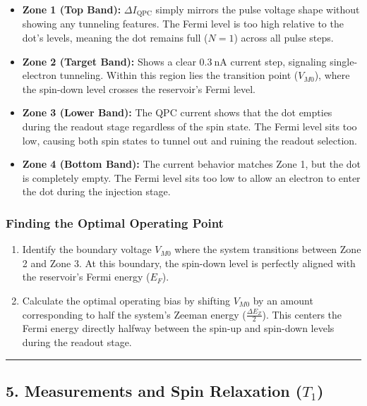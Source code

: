\documentclass[
]{article}
\providecommand{\tightlist}{%
  \setlength{\itemsep}{0pt}\setlength{\parskip}{0pt}}
\begin{document}
\begin{itemize}
\tightlist
\item
  \textbf{Zone 1 (Top Band):} \(\Delta I_{\text{QPC}}\) simply mirrors
  the pulse voltage shape without showing any tunneling features. The
  Fermi level is too high relative to the dot's levels, meaning the dot
  remains full (\(N=1\)) across all pulse steps.
\item
  \textbf{Zone 2 (Target Band):} Shows a clear \(0.3\ \text{nA}\)
  current step, signaling single-electron tunneling. Within this region
  lies the transition point (\(V_{M0}\)), where the spin-down level
  crosses the reservoir's Fermi level.
\item
  \textbf{Zone 3 (Lower Band):} The QPC current shows that the dot
  empties during the readout stage regardless of the spin state. The
  Fermi level sits too low, causing both spin states to tunnel out and
  ruining the readout selection.
\item
  \textbf{Zone 4 (Bottom Band):} The current behavior matches Zone 1,
  but the dot is completely empty. The Fermi level sits too low to allow
  an electron to enter the dot during the injection stage.
\end{itemize}

\subsubsection{Finding the Optimal Operating
Point}\label{finding-the-optimal-operating-point}

\begin{enumerate}
\def\labelenumi{\arabic{enumi}.}
\tightlist
\item
  Identify the boundary voltage \(V_{M0}\) where the system transitions
  between Zone 2 and Zone 3. At this boundary, the spin-down level is
  perfectly aligned with the reservoir's Fermi energy (\(E_F\)).
\item
  Calculate the optimal operating bias by shifting \(V_{M0}\) by an
  amount corresponding to half the system's Zeeman energy
  (\(\frac{\Delta E_Z}{2}\)). This centers the Fermi energy directly
  halfway between the spin-up and spin-down levels during the readout
  stage.
\end{enumerate}

\begin{center}\rule{0.5\linewidth}{0.5pt}\end{center}

\subsection{\texorpdfstring{5. Measurements and Spin Relaxation
(\(T_1\))}{5. Measurements and Spin Relaxation (T\_1)}}\label{measurements-and-spin-relaxation-t_1}
\end{document}
